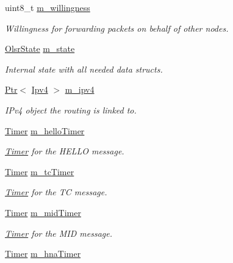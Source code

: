 \begin{DoxyCompactItemize}
uint8\+\_\+t \hyperlink{classns3_1_1olsr_1_1RoutingProtocol_a2e94c2954ffa92d1c7d3b627087c9430}{m\+\_\+willingness}
\begin{DoxyCompactList}\small\item\em Willingness for forwarding packets on behalf of other nodes. \end{DoxyCompactList}\item 
\hyperlink{classns3_1_1olsr_1_1OlsrState}{Olsr\+State} \hyperlink{classns3_1_1olsr_1_1RoutingProtocol_a07942ec1a7df71b609c8d2ff3b567c49}{m\+\_\+state}
\begin{DoxyCompactList}\small\item\em Internal state with all needed data structs. \end{DoxyCompactList}\item 
\hyperlink{classns3_1_1Ptr}{Ptr}$<$ \hyperlink{classns3_1_1Ipv4}{Ipv4} $>$ \hyperlink{classns3_1_1olsr_1_1RoutingProtocol_afede79b25ec57e797ff900ae01bca1df}{m\+\_\+ipv4}
\begin{DoxyCompactList}\small\item\em I\+Pv4 object the routing is linked to. \end{DoxyCompactList}\item 
\hyperlink{classns3_1_1Timer}{Timer} \hyperlink{classns3_1_1olsr_1_1RoutingProtocol_aa739535b4dfd71566cb385c9c58f59c9}{m\+\_\+hello\+Timer}
\begin{DoxyCompactList}\small\item\em \hyperlink{classns3_1_1Timer}{Timer} for the H\+E\+L\+LO message. \end{DoxyCompactList}\item 
\hyperlink{classns3_1_1Timer}{Timer} \hyperlink{classns3_1_1olsr_1_1RoutingProtocol_a31e8b4356d659f7ec1c82b86365a179d}{m\+\_\+tc\+Timer}
\begin{DoxyCompactList}\small\item\em \hyperlink{classns3_1_1Timer}{Timer} for the TC message. \end{DoxyCompactList}\item 
\hyperlink{classns3_1_1Timer}{Timer} \hyperlink{classns3_1_1olsr_1_1RoutingProtocol_a7d525e1847150003ef21cd962a66c759}{m\+\_\+mid\+Timer}
\begin{DoxyCompactList}\small\item\em \hyperlink{classns3_1_1Timer}{Timer} for the M\+ID message. \end{DoxyCompactList}\item 
\hyperlink{classns3_1_1Timer}{Timer} \hyperlink{classns3_1_1olsr_1_1RoutingProtocol_acaf11a25b83098c640a063a094148374}{m\+\_\+hna\+Timer}

\end{DoxyCompactItemize}
